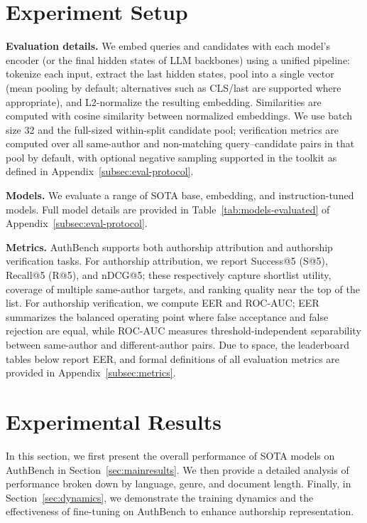 \documentclass{article}
\newcommand{\rev}[1]{#1}
\begin{document}
\section{Experiment Setup}
\textbf{Evaluation details.}  We embed queries and candidates with each model’s encoder (or the final hidden states of LLM backbones) using a unified pipeline: tokenize each input, extract the last hidden states, pool into a single vector (mean pooling by default; alternatives such as CLS/last are supported where appropriate), and L2-normalize the resulting embedding. Similarities are computed with \rev{cosine similarity} between normalized embeddings. \rev{We use batch size 32 and the full-sized within-split candidate pool; verification metrics are computed over all same-author and non-matching query--candidate pairs in that pool by default, with optional negative sampling supported in the toolkit as defined in Appendix~\ref{subsec:eval-protocol}.}

\noindent\textbf{Models.} We evaluate a range of SOTA base, embedding, and instruction-tuned models. Full model details are provided in Table~\ref{tab:models-evaluated} of Appendix~\ref{subsec:eval-protocol}.

\noindent\textbf{Metrics.} AuthBench supports both authorship attribution and authorship verification tasks. 
For authorship attribution, we report Success@5 (S@5), Recall@5 (R@5), and nDCG@5; \rev{these respectively capture shortlist utility, coverage of multiple same-author targets, and ranking quality near the top of the list.}
For authorship verification, \rev{we compute EER and ROC-AUC; EER summarizes the balanced operating point where false acceptance and false rejection are equal, while ROC-AUC measures threshold-independent separability between same-author and different-author pairs.}
\rev{Due to space, the leaderboard tables below report EER, and formal definitions of all evaluation metrics are provided in Appendix~\ref{subsec:metrics}.}

\section{Experimental Results}
\label{sec:experiments}
In this section, we first present the overall performance of SOTA models on AuthBench in Section~\ref{sec:mainresults}. We then provide a detailed analysis of performance broken down by language, genre, and document length. Finally, in Section~\ref{sec:dynamics}, we demonstrate the training dynamics and the effectiveness of fine-tuning on AuthBench to enhance authorship representation.
\end{document}
